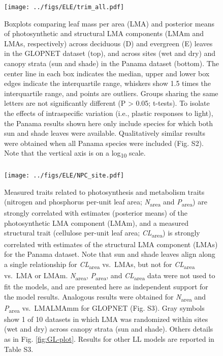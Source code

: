 \documentclass[12pt,]{article}
\let\oldsubparagraph\subparagraph
\renewcommand{\subparagraph}[1]{\oldsubparagraph{#1}\mbox{}}
\theoremstyle{definition}
\theoremstyle{definition}
\theoremstyle{definition}
\theoremstyle{remark}
\begin{document}
\newpage

\begin{figure}
\centering
\texttt{[image: ../figs/ELE/trim\_all.pdf]}
\caption{\label{fig:box-mean}Boxplots comparing leaf mass per area (LMA) and
posterior means of photosynthetic and structural LMA components (LMAm
and LMAs, respectively) across deciduous (D) and evergreen (E) leaves in
the GLOPNET dataset (top), and across sites (wet and dry) and canopy
strata (sun and shade) in the Panama dataset (bottom). The center line
in each box indicates the median, upper and lower box edges indicate the
interquartile range, whiskers show 1.5 times the interquartile range,
and points are outliers. Groups sharing the same letters are not
significantly different (P \textgreater{} 0.05; t-tests). To isolate the
effects of intraspecific variation (i.e., plastic responses to light),
the Panama results shown here only include species for which both sun
and shade leaves were available. Qualitatively similar results were
obtained when all Panama species were included (Fig. S2). Note that the
vertical axis is on a log\textsubscript{10} scale.}
\end{figure}

\hypertarget{section-6}{%
\subparagraph{}\label{section-6}}

\newpage

\begin{figure}
\centering
\texttt{[image: ../figs/ELE/NPC\_site.pdf]}
\caption{\label{fig:PA-NPC}Measured traits related to photosynthesis and
metabolism traits (nitrogen and phosphorus per-unit leaf area;
\emph{N}\textsubscript{area} and \emph{P}\textsubscript{area}) are
strongly correlated with estimates (posterior means) of the
photosynthetic LMA component (LMAm), and a measured structural trait
(cellulose per-unit leaf area; \emph{CL}\textsubscript{area}) is
strongly correlated with estimates of the structural LMA component
(LMAs) for the Panama dataset. Note that sun and shade leaves align
along a single relationship for \emph{CL}\textsubscript{area} vs.~LMAs,
but not for \emph{CL}\textsubscript{area} vs.~LMA or LMAm.
\emph{N}\textsubscript{area}, \emph{P}\textsubscript{area}, and
\emph{CL}\textsubscript{area} data were not used to fit the models, and
are presented here as independent support for the model results.
Analogous results were obtained for \emph{N}\textsubscript{area} and
\emph{P}\textsubscript{area} vs.~LMALMAmm for GLOPNET (Fig. S3). Gray
symbols show 1 of 10 datasets in which LMA was randomized within sites
(wet and dry) across canopy strata (sun and shade). Others details as in
Fig. \ref{fig:GL-plot}. Results for other LL models are reported in
Table S3.}
\end{figure}
\end{document}
